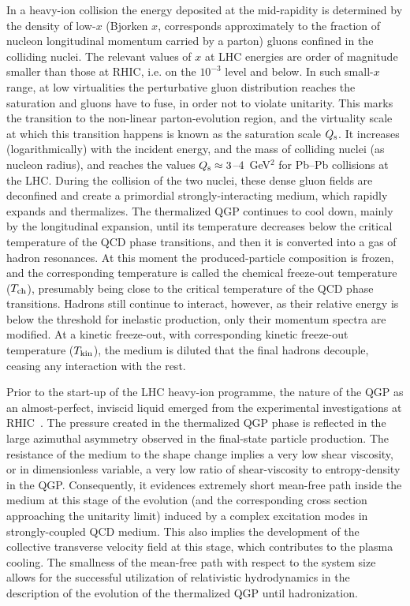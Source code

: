 In a heavy-ion collision the energy deposited at the mid-rapidity is determined by the density of low-$x$ (Bjorken $x$, corresponds approximately to the fraction of nucleon longitudinal momentum carried by a parton) gluons confined in the colliding nuclei. The relevant values of $x$ at LHC energies are order of magnitude smaller than those at RHIC, i.e. on the $10^{-3}$ level and below. In such small-$x$ range, at low virtualities the perturbative gluon distribution reaches the saturation and gluons have to fuse, in order not to violate unitarity.  This marks the transition to the non-linear parton-evolution region, and the virtuality scale at which this transition happens is known as the saturation scale $Q_{\rm s}$. It increases (logarithmically) with the incident energy, and the mass of colliding nuclei (as nucleon radius), and  reaches the values $Q_{\rm s} \approx 3$--$4$~GeV$^2$ for Pb--Pb collisions at the LHC. During the collision of the two nuclei, these dense gluon fields are deconfined and create a primordial strongly-interacting medium, which rapidly expands and thermalizes. The thermalized QGP continues to cool down, mainly by the longitudinal expansion, until its temperature decreases below the critical temperature of the QCD phase transitions, and then it is converted into a gas of hadron resonances. At this moment the produced-particle composition is frozen, and the corresponding temperature is called the chemical freeze-out temperature ($T_{\rm ch}$), presumably being close to the critical temperature of the QCD phase transitions. Hadrons still continue to interact, however, as their relative energy is below the threshold for inelastic production, only their momentum spectra are modified. At a kinetic freeze-out, with corresponding kinetic freeze-out temperature ($T_{\rm kin}$), the medium is diluted that the final hadrons decouple, ceasing any interaction with the rest.

Prior to the start-up of the LHC heavy-ion programme, the nature of the QGP as an almost-perfect, inviscid liquid emerged from the experimental investigations at RHIC~\cite{Tribble:2007nsac}. The pressure created in the thermalized QGP phase is reflected in the large azimuthal asymmetry observed in the final-state particle production. The resistance of the medium  to the shape change implies a very low shear viscosity, or in dimensionless variable, a very low ratio of shear-viscosity to entropy-density in the QGP. Consequently, it evidences extremely short mean-free path inside the medium at this stage of the evolution (and the corresponding cross section approaching the unitarity limit) induced by a complex excitation modes in strongly-coupled QCD medium. This also implies the development of the collective transverse velocity field at this stage, which contributes to the plasma cooling. The smallness of the mean-free path with respect to the system size allows for the successful utilization of relativistic hydrodynamics in the description of the evolution of the thermalized QGP until hadronization.

